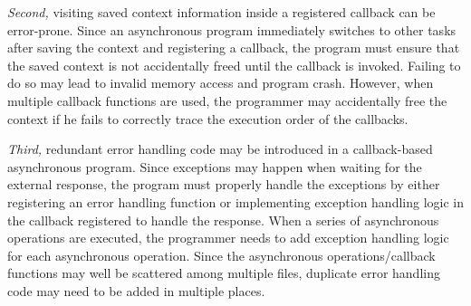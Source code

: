 

\textit{Second,} visiting saved context information inside a registered callback can be error-prone. Since an asynchronous program immediately switches to other tasks after saving the context and registering a callback, the program must ensure that the saved context is not accidentally freed until the callback is invoked. Failing to do so may lead to invalid memory access and program crash. However, when multiple callback functions are used, the programmer may accidentally free the context if he fails to correctly trace the execution order of the callbacks.

\textit{Third,} redundant error handling code may be introduced in a callback-based asynchronous program. Since exceptions may happen when waiting for the external response, the program must properly handle the exceptions by either registering an error handling function or implementing exception handling logic in the callback registered to handle the response. When a series of asynchronous operations are executed, the programmer needs to add exception handling logic for each asynchronous operation. %
 Since the asynchronous operations/callback functions may well be scattered among multiple files, duplicate error handling code may need to be added in multiple places.

